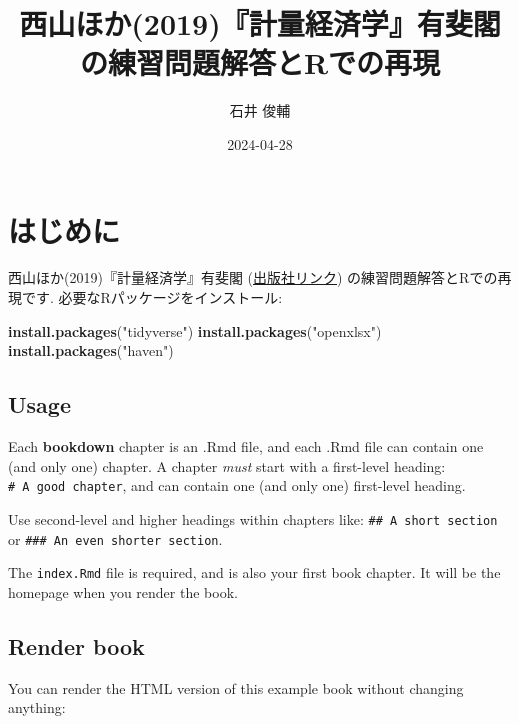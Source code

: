 \documentclass[
]{book}
\title{西山ほか(2019)『計量経済学』有斐閣の練習問題解答とRでの再現}
\author{石井 俊輔}
\date{2024-04-28}
\newenvironment{Shaded}{\begin{snugshade}}{\end{snugshade}}
\newcommand{\FunctionTok}[1]{\textcolor[rgb]{0.13,0.29,0.53}{\textbf{#1}}}
\newcommand{\NormalTok}[1]{#1}
\newcommand{\StringTok}[1]{\textcolor[rgb]{0.31,0.60,0.02}{#1}}
\begin{document}
\maketitle

{
\setcounter{tocdepth}{1}
\tableofcontents
}
\hypertarget{ux306fux3058ux3081ux306b}{%
\chapter*{はじめに}\label{ux306fux3058ux3081ux306b}}

西山ほか(2019)『計量経済学』有斐閣 (\href{https://www.yuhikaku.co.jp/books/detail/9784641053854}{出版社リンク}) の練習問題解答とRでの再現です.
必要なRパッケージをインストール:

\begin{Shaded}
\begin{Highlighting}[]
\FunctionTok{install.packages}\NormalTok{(}\StringTok{"tidyverse"}\NormalTok{)}
\FunctionTok{install.packages}\NormalTok{(}\StringTok{"openxlsx"}\NormalTok{)}
\FunctionTok{install.packages}\NormalTok{(}\StringTok{"haven"}\NormalTok{)}
\end{Highlighting}
\end{Shaded}

\hypertarget{usage}{%
\section{Usage}\label{usage}}

Each \textbf{bookdown} chapter is an .Rmd file, and each .Rmd file can contain one (and only one) chapter. A chapter \emph{must} start with a first-level heading: \texttt{\#\ A\ good\ chapter}, and can contain one (and only one) first-level heading.

Use second-level and higher headings within chapters like: \texttt{\#\#\ A\ short\ section} or \texttt{\#\#\#\ An\ even\ shorter\ section}.

The \texttt{index.Rmd} file is required, and is also your first book chapter. It will be the homepage when you render the book.

\hypertarget{render-book}{%
\section{Render book}\label{render-book}}

You can render the HTML version of this example book without changing anything:
\end{document}
